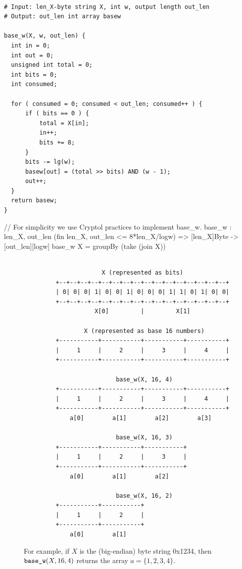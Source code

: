 \begin{lstlisting}[label=alg:basew, language=pseudoc,
                   caption=\basew \ -- Computing the base-$w$ representation]

# Input: len_X-byte string X, int w, output length out_len
# Output: out_len int array basew

base_w(X, w, out_len) {
  int in = 0;
  int out = 0;
  unsigned int total = 0;
  int bits = 0;
  int consumed;

  for ( consumed = 0; consumed < out_len; consumed++ ) {
      if ( bits == 0 ) {
          total = X[in];
          in++;
          bits += 8;
      }
      bits -= lg(w);
      basew[out] = (total >> bits) AND (w - 1);
      out++;
  }
  return basew;
}
\end{lstlisting}

\begin{code}
  // For simplicity we use Cryptol practices to implement base_w.
  base_w : {len_X, out_len} (fin len_X, out_len <= 8*len_X/logw) =>
    [len_X]Byte -> [out_len][logw]
  base_w X = groupBy (take (join X))
\end{code}

\begin{figure}[h]
\caption{For example, if $X$ is the (big-endian) byte string 0x1234, then
   $\texttt{base\_w}(X, 16, 4)$ returns the array $a = \{1, 2, 3, 4\}$.}
\begin{verbatim}

                      X (represented as bits)
         +--+--+--+--+--+--+--+--+--+--+--+--+--+--+--+--+
         | 0| 0| 0| 1| 0| 0| 1| 0| 0| 0| 1| 1| 0| 1| 0| 0|
         +--+--+--+--+--+--+--+--+--+--+--+--+--+--+--+--+
                    X[0]         |         X[1]

                 X (represented as base 16 numbers)
         +-----------+-----------+-----------+-----------+
         |     1     |     2     |     3     |     4     |
         +-----------+-----------+-----------+-----------+

                          base_w(X, 16, 4)
         +-----------+-----------+-----------+-----------+
         |     1     |     2     |     3     |     4     |
         +-----------+-----------+-----------+-----------+
             a[0]        a[1]        a[2]        a[3]

                          base_w(X, 16, 3)
         +-----------+-----------+-----------+
         |     1     |     2     |     3     |
         +-----------+-----------+-----------+
             a[0]        a[1]        a[2]

                          base_w(X, 16, 2)
         +-----------+-----------+
         |     1     |     2     |
         +-----------+-----------+
             a[0]        a[1] 
\end{verbatim}
\label{example:basew}
\end{figure}
             
